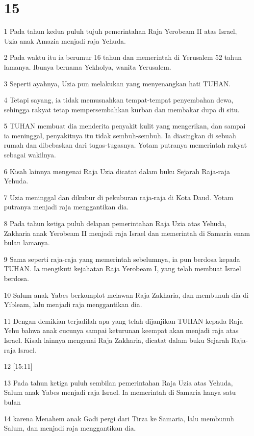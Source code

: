 \chapter{15}

\par 1 Pada tahun kedua puluh tujuh pemerintahan Raja Yerobeam II atas Israel, Uzia anak Amazia menjadi raja Yehuda.
\par 2 Pada waktu itu ia berumur 16 tahun dan memerintah di Yerusalem 52 tahun lamanya. Ibunya bernama Yekholya, wanita Yerusalem.
\par 3 Seperti ayahnya, Uzia pun melakukan yang menyenangkan hati TUHAN.
\par 4 Tetapi sayang, ia tidak memusnahkan tempat-tempat penyembahan dewa, sehingga rakyat tetap mempersembahkan kurban dan membakar dupa di situ.
\par 5 TUHAN membuat dia menderita penyakit kulit yang mengerikan, dan sampai ia meninggal, penyakitnya itu tidak sembuh-sembuh. Ia diasingkan di sebuah rumah dan dibebaskan dari tugas-tugasnya. Yotam putranya memerintah rakyat sebagai wakilnya.
\par 6 Kisah lainnya mengenai Raja Uzia dicatat dalam buku Sejarah Raja-raja Yehuda.
\par 7 Uzia meninggal dan dikubur di pekuburan raja-raja di Kota Daud. Yotam putranya menjadi raja menggantikan dia.
\par 8 Pada tahun ketiga puluh delapan pemerintahan Raja Uzia atas Yehuda, Zakharia anak Yerobeam II menjadi raja Israel dan memerintah di Samaria enam bulan lamanya.
\par 9 Sama seperti raja-raja yang memerintah sebelumnya, ia pun berdosa kepada TUHAN. Ia mengikuti kejahatan Raja Yerobeam I, yang telah membuat Israel berdosa.
\par 10 Salum anak Yabes berkomplot melawan Raja Zakharia, dan membunuh dia di Yibleam, lalu menjadi raja menggantikan dia.
\par 11 Dengan demikian terjadilah apa yang telah dijanjikan TUHAN kepada Raja Yehu bahwa anak cucunya sampai keturunan keempat akan menjadi raja atas Israel. Kisah lainnya mengenai Raja Zakharia, dicatat dalam buku Sejarah Raja-raja Israel.
\par 12 [15:11]
\par 13 Pada tahun ketiga puluh sembilan pemerintahan Raja Uzia atas Yehuda, Salum anak Yabes menjadi raja Israel. Ia memerintah di Samaria hanya satu bulan
\par 14 karena Menahem anak Gadi pergi dari Tirza ke Samaria, lalu membunuh Salum, dan menjadi raja menggantikan dia.
